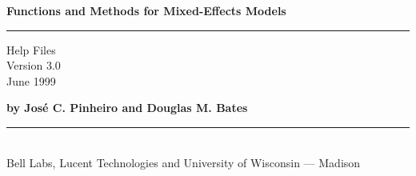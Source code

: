 \documentclass[pdftex]{article} \usepackage{url,graphicx}
\newcommand{\HRule}{\rule{\linewidth}{2mm}}
\newcommand{\Hrule}{\rule{\linewidth}{1mm}}
\begin{document}
\pdfpagewidth=175mm
\pdfpageheight=245mm

\thispagestyle{empty}
\begin{flushleft}
  {\Large {\bf Functions and Methods for Mixed-Effects Models}}
\end{flushleft}
\HRule
{\large
\begin{flushright}
   Help Files \\
   Version 3.0\\
   June 1999
\end{flushright}
}


\begin{flushleft}
  {\large \bf by Jos\'e C. Pinheiro and Douglas M. Bates}\\
  \Hrule\\
  Bell Labs, Lucent Technologies and University of Wisconsin --- Madison
\end{flushleft}

\newpage
\end{document}
